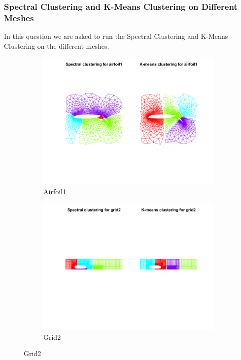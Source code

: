 \documentclass[unicode,11pt,a4paper,oneside,numbers=endperiod,openany]{scrartcl}
\begin{document}
\subsubsection{Spectral Clustering and K-Means Clustering on Different Meshes}
In this question we are asked to run the Spectral Clustering and K-Means Clustering on the different meshes.

\begin{figure}[H]
    \centering
    \begin{subfigure}{0.45\textwidth}
        \centering
        \includegraphics[width=\linewidth]{figures/2.2_airfoil1.png}
        \caption{Airfoil1}
        \label{fig:airfoil1-2.2}
    \end{subfigure}
    \hfill
    \begin{subfigure}{0.45\textwidth}
        \centering
        \includegraphics[width=\linewidth]{figures/2.2_grid2.png}
        \caption{Grid2}
        \label{fig:grid2-2.2}
    \end{subfigure}


\end{figure}
\end{document}
